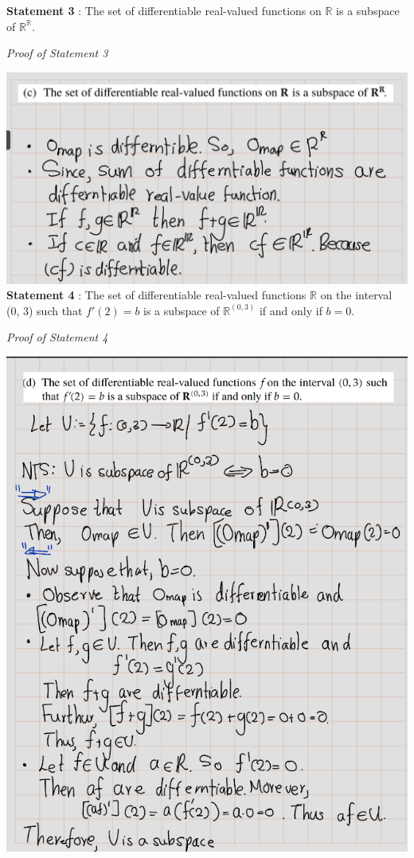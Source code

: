 \documentclass[
]{book}
\theoremstyle{definition}
\theoremstyle{definition}
\theoremstyle{definition}
\theoremstyle{definition}
\theoremstyle{remark}
\begin{document}
\textbf{Statement 3} : The set of differentiable real-valued functions on \(\mathbb{R}\) is a subspace of \(\mathbb{R}^{\mathbb{R}}\).

\emph{Proof of Statement 3}

\includegraphics[width=19.4in]{fig/Ex1C/Ex2-c}
\textbf{Statement 4} : The set of differentiable real-valued functions \(\mathbb{R}\) on the interval (0, 3) such that \(f'(2)=b\) is a subspace of \(\mathbb{R}^{(0,3)}\) if and only if \(b = 0\).

\emph{Proof of Statement 4}

\includegraphics[width=9.03in]{fig/Ex1C/Ex2-d}
\end{document}
